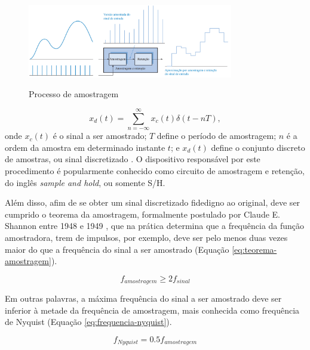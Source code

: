 \documentclass[oneside,openright,12pt]{ufsm_2015} %
\begin{document}
\begin{figure}[ht]
    \caption{\label{exepretex} Processo de amostragem}
    \centering
    \includegraphics[width=0.8\textwidth]{figuras/sample-and-hold.png}
    \vspace{\baselineskip} %
        \label{fig:processo-de-amostragem}
\end{figure}

\begin{equation}\label{eq:amostragem}
    x_{d}(t) = \sum\limits_{n = -\infty}^\infty x_{c}(t)\delta(t-nT),
\end{equation}
onde $x_{c}(t)$ é o sinal a ser amostrado; $T$ define o período de amostragem;  $n$ é a ordem da amostra em determinado instante $t$; e $x_{d}(t)$ define o conjunto discreto de amostras, ou sinal discretizado \cite{livro:discrete-time-signal-processing}. O dispositivo responsável por este procedimento é popularmente conhecido como circuito de amostragem e retenção, do inglês \textit{sample and hold}, ou somente S/H.

Além disso, afim de se obter um sinal discretizado fidedigno ao original, deve ser cumprido o teorema da amostragem, formalmente postulado por Claude E. Shannon entre 1948 e 1949 \cite{luke1999origins}, que na prática determina que a frequência da função amostradora, trem de impulsos, por exemplo, deve ser pelo menos duas vezes maior do que a frequência do sinal a ser amostrado (Equação \ref{eq:teorema-amostragem}). 

\begin{equation}\label{eq:teorema-amostragem}
    f_{amostragem} \geq 2f_{sinal}
\end{equation}

Em outras palavras, a máxima frequência do sinal a ser amostrado deve ser inferior à metade da frequência de amostragem, mais conhecida como frequência de Nyquist (Equação \ref{eq:frequencia-nyquist}).

\begin{equation}\label{eq:frequencia-nyquist}
    f_{Nyquist} = 0.5f_{amostragem}
\end{equation}
\end{document}
